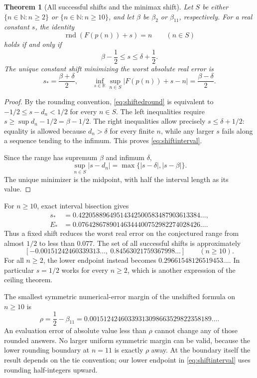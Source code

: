 \documentclass[11pt]{article}
\numberwithin{equation}{section}
\newtheorem{theorem}{Theorem}[section]
\theoremstyle{definition}
\theoremstyle{remark}
\newcommand{\N}{\mathbb N}
\newcommand{\R}{\mathbb R}
\newcommand{\rnd}{\operatorname{rnd}}
\begin{document}
\begin{theorem}[All successful shifts and the minimax shift]\label{thm:shifts}
Let $S$ be either $\{n\in\N:n\ge2\}$ or $\{n\in\N:n\ge10\}$, and let
$\beta$ be $\beta_2$ or $\beta_{11}$, respectively. For a real constant
$s$, the identity
\begin{equation}\label{eq:shiftedround}
 \rnd(F(p(n))+s)=n\qquad(n\in S)
\end{equation}
holds if and only if
\begin{equation}\label{eq:shiftinterval}
 \beta-\frac12\le s\le\delta+\frac12.
\end{equation}
The unique constant shift minimizing the worst absolute real error is
\begin{equation}\label{eq:minimax}
 s_* =\frac{\beta+\delta}{2},\qquad
 \inf_{s\in\R}\sup_{n\in S}|F(p(n))+s-n|
 =\frac{\beta-\delta}{2}.
\end{equation}
\end{theorem}
\begin{proof}
By the rounding convention, \eqref{eq:shiftedround} is equivalent to
$-1/2\le s-d_n<1/2$ for every $n\in S$. The left inequalities require
$s\ge\sup d_n-1/2=\beta-1/2$. The right inequalities allow precisely
$s\le\delta+1/2$: equality is allowed because $d_n>\delta$ for every
finite $n$, while any larger $s$ fails along a sequence tending to the
infimum. This proves \eqref{eq:shiftinterval}.

Since the range has supremum $\beta$ and infimum $\delta$,
\[
 \sup_{n\in S}|s-d_n|=\max\{|s-\delta|,|s-\beta|\}.
\]
The unique minimizer is the midpoint, with half the interval length as
its value.
\end{proof}

For $n\ge10$, exact interval bisection gives
\begin{align*}
 s_*&=0.42205889649514342500583487903613384\ldots,\\
 E_*&=0.07642867890146344400752982274028426\ldots.
\end{align*}
Thus a fixed shift reduces the worst real error on the conjectured
range from almost $1/2$ to less than $0.077$. The set of all successful
shifts is approximately
\[
 [-0.00151242460339313\ldots,\ 0.84563021759367998\ldots]
 \qquad(n\ge10).
\]
For all $n\ge2$, the lower endpoint instead becomes
$0.29661548126519453\ldots$. In particular $s=1/2$ works for every
$n\ge2$, which is another expression of the ceiling theorem.

The smallest symmetric numerical-error margin of the unshifted
formula on $n\ge10$ is
\begin{equation}\label{eq:roundmargin}
 \rho=\frac12-\beta_{11}
 =0.00151242460339313098663529822358189\ldots.
\end{equation}
An evaluation error of absolute value less than $\rho$ cannot change
any of those rounded answers. No larger uniform symmetric margin can
be valid, because the lower rounding boundary at $n=11$ is exactly
$\rho$ away. At the boundary itself the result depends on the tie
convention; our lower endpoint in \eqref{eq:shiftinterval} uses
rounding half-integers upward.
\end{document}
